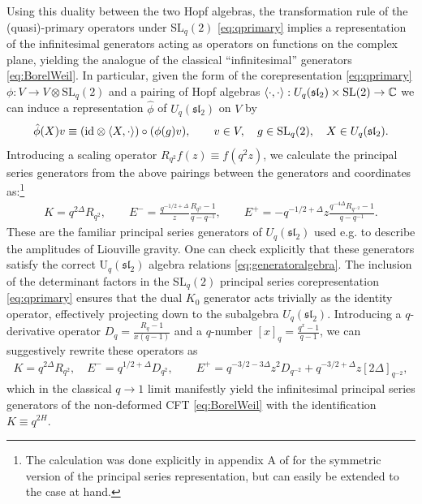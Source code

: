 \documentclass[a4paper,titlepage,12pt]{article}
\numberwithin{equation}{section}
\begin{document}
Using this duality between the two Hopf algebras, the transformation rule of the (quasi)-primary operators under SL$_q(2)$ \eqref{eq:qprimary} implies a representation of the infinitesimal generators acting as operators on functions on the complex plane, yielding the analogue of the classical ``infinitesimal'' generators \eqref{eq:BorelWeil}. In particular, given the form of the corepresentation \eqref{eq:qprimary} $\phi : V \to V \otimes \text{SL}_q(2)$ and a pairing of Hopf algebras $\braket{\cdot, \cdot} : U_q(\mathfrak{sl}_2) \times \text{SL}(2) \to \mathbb{C}$ we can induce a representation $\hat{\phi}$ of $U_q(\mathfrak{sl}_2)$ on $V$ by
\begin{equation}
    \hat{\phi}(X) v \equiv (\text{id} \otimes \braket{X, \cdot}) \circ (\phi(g) v),\qquad v\in V, \quad g\in \text{SL}_q(2), \quad X\in U_q(\mathfrak{sl}_2).
\end{equation}
Introducing a scaling operator $R_{q^2}f(z)\equiv f(q^2z)$, we calculate the principal series generators from the above pairings between the generators and coordinates as:\footnote{The calculation was done explicitly in appendix A of \cite{Belaey:2025ijg} for the symmetric version of the principal series representation, but can easily be extended to the case at hand.} 
\begin{align}
\label{eq:qprincipalgenerators}
    K=q^{2\Delta}R_{q^2}, \qquad E^-=\frac{q^{-1/2+\Delta}}{z}\frac{R_{q^2}-1}{q-q^{-1}}, \qquad E^+=-q^{-1/2+\Delta} z\frac{q^{-4\Delta} R_{q^{-2}}-1}{q-q^{-1}}.
\end{align}
These are the familiar principal series generators of $U_q(\mathfrak{sl}_2)$ \cite{Ponsot:1999uf,Ponsot:2000mt,Kharchev:2001rs} used e.g. to describe the amplitudes of Liouville gravity. One can check explicitly that these generators satisfy the correct U$_q(\mathfrak{sl}_2)$ algebra relations \eqref{eq:generatoralgebra}. The inclusion of the determinant factors in the SL$_q(2)$ principal series corepresentation \eqref{eq:qprimary} ensures that the dual $K_0$ generator acts trivially as the identity operator, effectively projecting down to the subalgebra $U_q(\mathfrak{sl}_2)$. Introducing a $q$-derivative operator $D_{q}=\frac{R_q-1}{x(q-1)}$ and a $q$-number $[x]_q=\frac{q^{x}-1}{q-1}$, we can suggestively rewrite these operators as 
\begin{align}
    K=q^{2\Delta}R_{q^2}, \quad E^-=q^{1/2+\Delta}D_{q^2}, \qquad E^+=q^{-3/2-3\Delta}z^2D_{q^{-2}}+q^{-3/2+\Delta}z[2\Delta]_{q^{-2}},
\end{align}  
which in the classical $q\rightarrow1$ limit manifestly yield the infinitesimal principal series generators of the non-deformed CFT \eqref{eq:BorelWeil} with the identification $K\equiv q^{2H}$.
\end{document}
